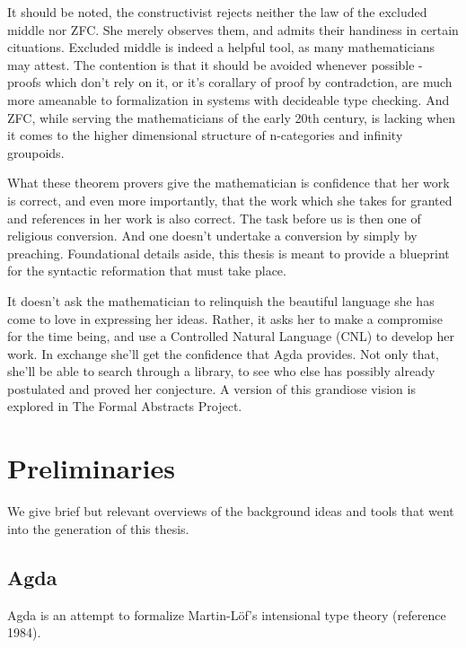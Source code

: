 \documentclass[11pt, a4paper]{article}
\begin{document}
It should be noted, the constructivist rejects neither the law of the excluded
middle nor ZFC. She merely observes them, and admits their handiness in certain
cituations. Excluded middle is indeed a helpful tool, as many mathematicians
may attest. The contention is that it should be avoided whenever possible -
proofs which don't rely on it, or it's corallary of proof by contradction, are
much more ameanable to formalization in systems with decideable type checking.
And ZFC, while serving the mathematicians of the early 20th century, is 
lacking when it comes to the higher dimensional structure of n-categories and
infinity groupoids.

What these theorem provers give the mathematician is confidence that her work
is correct, and even more importantly, that the work which she takes for
granted and references in her work is also correct. The task before us is then
one of religious conversion. And one doesn't undertake a conversion by simply
by preaching. Foundational details aside, this thesis is meant to provide a
blueprint for the syntactic reformation that must take place.  

It doesn't ask the mathematician to relinquish the beautiful language she has
come to love in expressing her ideas.  Rather, it asks her to make a compromise
for the time being, and use a Controlled Natural Language (CNL) to develop her
work. In exchange she'll get the confidence that Agda provides. Not only that,
she'll be able to search through a library, to see who else has possibly
already postulated and proved her conjecture. A version of this grandiose vision is 
explored in The Formal Abstracts Project.





\section{Preliminaries}

We give brief but relevant overviews of the background ideas and tools that went
into the generation of this thesis. 







\subsection{Agda}

Agda is an attempt to formalize Martin-Löf's intensional type theory (reference 1984).
\end{document}
